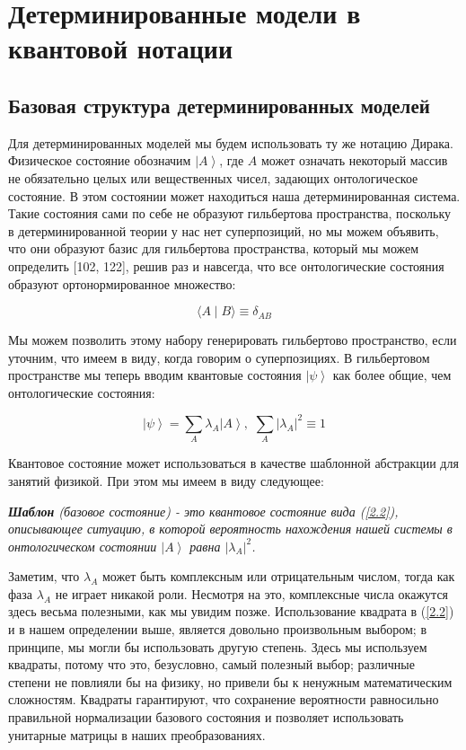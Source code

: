 \documentclass[main.tex]{subfiles}
\begin{document}
\section{Детерминированные модели в квантовой нотации}\label{ch2}

\subsection{Базовая структура детерминированных моделей}\label{ch2.1}

Для детерминированных моделей мы будем использовать ту же нотацию Дирака. Физическое состояние обозначим $\left|A\right>$, где $A$ может означать некоторый массив не обязательно целых или вещественных чисел, задающих онтологическое состояние. В этом состоянии может находиться наша детерминированная система. Такие состояния сами по себе не образуют гильбертова пространства, поскольку в детерминированной теории у нас нет суперпозиций, но мы можем объявить, что они образуют базис для гильбертова пространства, который мы можем определить [102, 122], решив раз и навсегда, что все онтологические состояния образуют ортонормированное множество: 

\begin{equation}\label{2.1}
	\langle A\mid B\rangle  \equiv \delta_{AB}
\end{equation}

Мы можем позволить этому набору генерировать гильбертово пространство, если уточним, что имеем в виду, когда говорим о суперпозициях. В гильбертовом пространстве мы теперь вводим квантовые состояния $\left|\psi\right>$ как более общие, чем онтологические состояния:

\begin{equation}\label{2.2}
	 \left|\psi\right> = \sum_A \lambda_A \left|A\right>, \,\,
	 \sum_A |\lambda_A|^2 \equiv 1
\end{equation}

Квантовое состояние может использоваться в качестве шаблонной абстракции для занятий физикой. При этом мы имеем в виду следующее: 

\textit{\textbf{Шаблон} (базовое состояние) - это квантовое состояние вида (\ref{2.2}), описывающее ситуацию, в которой вероятность нахождения нашей системы в онтологическом состоянии $\left|A\right>$ равна $|\lambda_A|^2$. }

Заметим, что $\lambda_A$ может быть комплексным или отрицательным числом, тогда как фаза $\lambda_A$ не играет никакой роли. Несмотря на это, комплексные числа окажутся здесь весьма полезными, как мы увидим позже. Использование квадрата в (\ref{2.2}) и в нашем определении выше, является довольно произвольным выбором; в принципе, мы могли бы использовать другую степень. Здесь мы используем квадраты, потому что это, безусловно, самый полезный выбор; различные степени не повлияли бы на физику, но привели бы к ненужным математическим сложностям. Квадраты гарантируют, что сохранение вероятности равносильно правильной нормализации базового состояния и позволяет использовать унитарные матрицы в наших преобразованиях.  
\end{document}
